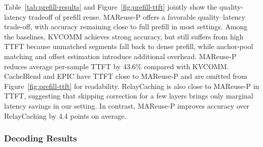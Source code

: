 \documentclass[letterpaper]{article} %
\begin{document}
Table~\ref{tab:prefill-results} and Figure~\ref{fig:prefill-ttft} jointly show the quality-latency tradeoff of prefill reuse. MAReuse-P offers a favorable quality--latency trade-off, with accuracy remaining close to full prefill in most settings. Among the baselines, KVCOMM achieves strong accuracy, but still suffers from high TTFT because unmatched segments fall back to dense prefill, while anchor-pool matching and offset estimation introduce additional overhead. MAReuse-P reduces average per-sample TTFT by 43.6\% compared with KVCOMM. CacheBlend and EPIC have TTFT close to MAReuse-P and are omitted from Figure~\ref{fig:prefill-ttft} for readability. RelayCaching is also close to MAReuse-P in TTFT, suggesting that skipping correction for a few layers brings only marginal latency savings in our setting. In contrast, MAReuse-P improves accuracy over RelayCaching by 4.4 points on average.

\subsubsection{Decoding Results}
\end{document}
